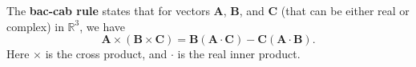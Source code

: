 \documentclass[12pt]{article}
\newcommand{\sR}[0]{\mathbb{R}}
\begin{document}
The {\bf bac-cab rule} states that for vectors 
$\mathbf{A}$, $\mathbf{B}$, and
$\mathbf{C}$ (that can be either real or complex) in $\sR^3$, we have
$$ \mathbf{A}\times (\mathbf{B}\times \mathbf{C}) = \mathbf{B} (\mathbf{A}\cdot \mathbf{C}) - \mathbf{C} (\mathbf{A} \cdot \mathbf{B}).$$
Here $\times$ is the cross product, and $\cdot$ is the real inner product.
\end{document}
